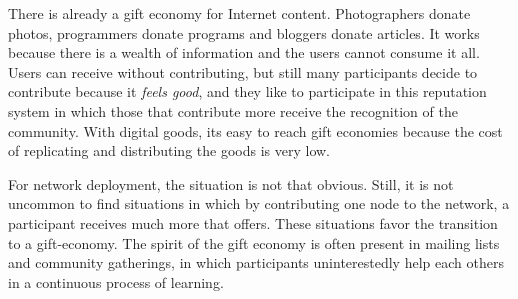 \documentclass[journal]{IEEEtran}
\begin{document}
There is already a gift economy for Internet content.
Photographers donate photos, programmers donate programs and bloggers donate articles.
It works because there is a wealth of information and the users cannot consume it all.
Users can receive without contributing, but still many participants decide to contribute because it \emph{feels good}, and they like to participate in this reputation system in which those that contribute more receive the recognition of the community.
With digital goods, its easy to reach gift economies because the cost of replicating and distributing the goods is very low.

For network deployment, the situation is not that obvious.
Still, it is not uncommon to find situations in which by contributing one node to the network, a participant receives much more that offers.
These situations favor the transition to a gift-economy.
The spirit of the gift economy is often present in mailing lists and community gatherings, in which participants uninterestedly help each others in a continuous process of learning.




\end{document}
